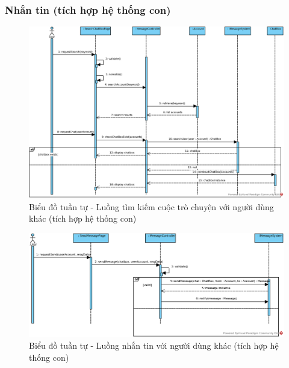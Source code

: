 \documentclass[./../main.tex]{subfiles}
\begin{document}
\subsubsection{Nhắn tin (tích hợp hệ thống con)}
\begin{figure}[H]
    \centering
    \includegraphics[width=\linewidth]{./images/UseCaseDesignDiagram/ucr_ss_searchChatBox.eps}
    \caption{Biểu đồ tuần tự - Luồng tìm kiếm cuộc trò chuyện với người dùng khác (tích hợp hệ thống con)}
\end{figure}
\begin{figure}[H]
    \centering
    \includegraphics[width=\linewidth]{./images/UseCaseDesignDiagram/ucr_ss_message.eps}
    \caption{Biểu đồ tuần tự - Luồng nhắn tin với người dùng khác (tích hợp hệ thống con)}
\end{figure}
\end{document}
